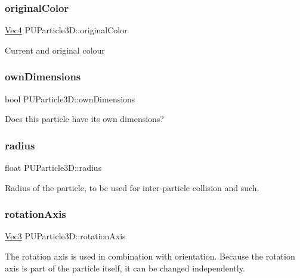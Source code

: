 \subsubsection{\texorpdfstring{original\+Color}{originalColor}}
{\footnotesize\ttfamily \hyperlink{classVec4}{Vec4} P\+U\+Particle3\+D\+::original\+Color}

Current and original colour \mbox{\label{structPUParticle3D_a294cf9e29d5e6ef8eaed9bd3b372a447}} 
\subsubsection{\texorpdfstring{own\+Dimensions}{ownDimensions}}
{\footnotesize\ttfamily bool P\+U\+Particle3\+D\+::own\+Dimensions}

Does this particle have it\textquotesingle{}s own dimensions? \mbox{\label{structPUParticle3D_a547376686a4c0e2ade7c8828c109f5e4}} 
\subsubsection{\texorpdfstring{radius}{radius}}
{\footnotesize\ttfamily float P\+U\+Particle3\+D\+::radius}

Radius of the particle, to be used for inter-\/particle collision and such. \mbox{\label{structPUParticle3D_acc143a77013198fb296307e67fbe0388}} 
\subsubsection{\texorpdfstring{rotation\+Axis}{rotationAxis}}
{\footnotesize\ttfamily \hyperlink{classVec3}{Vec3} P\+U\+Particle3\+D\+::rotation\+Axis}

The rotation axis is used in combination with orientation. Because the rotation axis is part of the particle itself, it can be changed independently. \mbox{\label{structPUParticle3D_a57c73b86cc4f19f7b87665014cfe9dd4}} 
